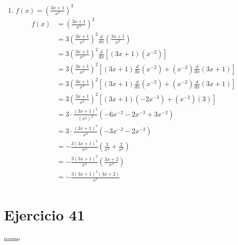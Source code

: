 \documentclass[12pt]{article}
\begin{document}
\begin{enumerate}[label=(\alph*)]
\item $f(x)=\left( \frac{3x+1}{x^2} \right)^3$
  \begin{equation*}
    \begin{split}
      f(x)
      &=\left( \frac{3x+1}{x^2} \right)^3\\
      &= 3\left( \frac{3x+1}{x^2} \right)^2 \frac{d}{dx}\left( \frac{3x+1}{x^2} \right)\\
      &= 3\left( \frac{3x+1}{x^2} \right)^2 \frac{d}{dx}\left[(3x+1)(x^{-2})\right]\\
      &= 3\left( \frac{3x+1}{x^2} \right)^2 \left[
      (3x+1)\frac{d}{dx}(x^{-2})+(x^{-2})\frac{d}{dx}(3x+1) \right]\\
      &= 3\left( \frac{3x+1}{x^2} \right)^2 \left[
      (3x+1)\frac{d}{dx}(x^{-2})+(x^{-2})\frac{d}{dx}(3x+1) \right]\\
      &= 3\left( \frac{3x+1}{x^2} \right)^2 \left[ (3x+1)(-2x^{-3})+(x^{-2})(3) \right]\\
      &= 3\cdot \frac{(3x+1)^2}{(x^2)^2} \left( -6x^{-2}-2x^{-3}+3x^{-2} \right)\\
      &= 3 \cdot \frac{(3x+1)^2}{x^4} \left( -3x^{-2}-2x^{-3} \right)\\
      &= -\frac{3(3x+1)^2}{x^4} \left( \frac{3}{x^2}+\frac{2}{x^3} \right)\\
      &= -\frac{3(3x+1)^2}{x^4} \left( \frac{3x+2}{x^3} \right)\\
      &= -\frac{3(3x+1)^2(3x+2)}{x^7} \\
    \end{split}
  \end{equation*}
  
\end{enumerate}

\section{Ejercicio 41} name \\
\end{document}
